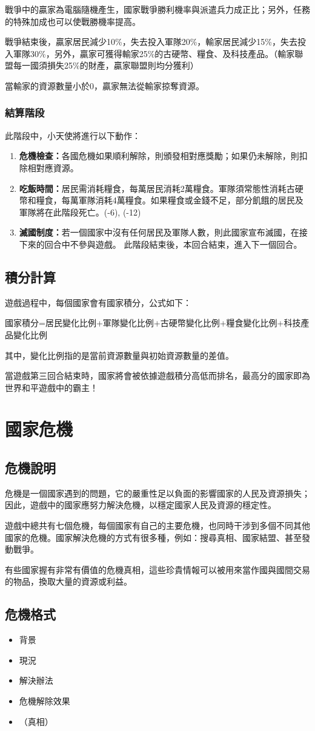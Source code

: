 戰爭中的贏家為電腦隨機產生，國家戰爭勝利機率與派遣兵力成正比；另外，任務的特殊加成也可以使戰勝機率提高。

戰爭結束後，贏家居民減少10\%，失去投入軍隊20\%，輸家居民減少15\%，失去投入軍隊30\%，另外，贏家可獲得輸家25\%的古硬幣、糧食、及科技產品。（輸家聯盟每一國須損失25\%的財產，贏家聯盟則均分獲利）

當輸家的資源數量小於0，贏家無法從輸家掠奪資源。

\subsubsection{結算階段}

此階段中，小天使將進行以下動作：
\begin{enumerate}
    \item \textbf{危機檢查：}各國危機如果順利解除，則頒發相對應獎勵；如果仍未解除，則扣除相對應資源。
    \item \textbf{吃飯時間：}居民需消耗糧食，每萬居民消耗2萬糧食。軍隊須常態性消耗古硬幣和糧食，每萬軍隊消耗4萬糧食。如果糧食或金錢不足，部分飢餓的居民及軍隊將在此階段死亡。(-6), (-12)
    \item \textbf{滅國制度：}若一個國家中沒有任何居民及軍隊人數，則此國家宣布滅國，在接下來的回合中不參與遊戲。
    此階段結束後，本回合結束，進入下一個回合。
\end{enumerate}

\subsection{積分計算}

遊戲過程中，每個國家會有國家積分，公式如下：
\begin{center}
國家積分=居民變化比例+軍隊變化比例+古硬幣變化比例+糧食變化比例+科技產品變化比例 
\end{center}

其中，變化比例指的是當前資源數量與初始資源數量的差值。

當遊戲第三回合結束時，國家將會被依據遊戲積分高低而排名，最高分的國家即為世界和平遊戲中的霸主！

\section{國家危機}
\subsection{危機說明}
危機是一個國家遇到的問題，它的嚴重性足以負面的影響國家的人民及資源損失；因此，遊戲中的國家應努力解決危機，以穩定國家人民及資源的穩定性。

遊戲中總共有七個危機，每個國家有自己的主要危機，也同時干涉到多個不同其他國家的危機。國家解決危機的方式有很多種，例如：搜尋真相、國家結盟、甚至發動戰爭。

有些國家握有非常有價值的危機真相，這些珍貴情報可以被用來當作國與國間交易的物品，換取大量的資源或利益。

\subsection{危機格式}
\begin{itemize}
    \item 背景
    \item 現況
    \item 解決辦法
    \item 危機解除效果
    \item （真相）
\end{itemize}

